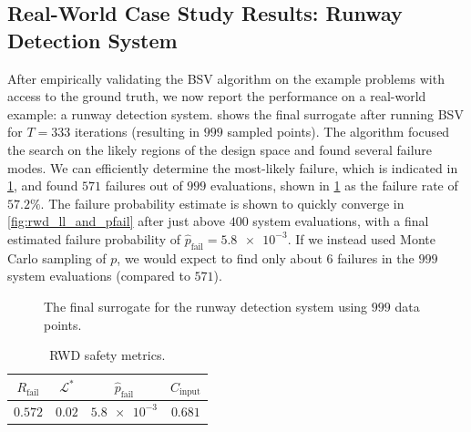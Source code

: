 \subsection{Real-World Case Study Results: Runway Detection System}

After empirically validating the BSV algorithm on the example problems with access to the ground truth, we now report the performance on a real-world example: a runway detection system.
 shows the final surrogate after running BSV for $T=333$ iterations (resulting in $999$ sampled points).
The algorithm focused the search on the likely regions of the design space and found several failure modes.
We can efficiently determine the most-likely failure, which is indicated in \cref{fig:rwd_surrogate}, and found $571$ failures out of $999$ evaluations, shown in \cref{tab:results_rwd} as the failure rate of $57.2 \%$.
The failure probability estimate is shown to quickly converge in \cref{fig:rwd_ll_and_pfail} after just above $400$ system evaluations, with a final estimated failure probability of $\hat{p}_\text{fail} = \num{5.8e-3}$.
If we instead used Monte Carlo sampling of $p$, we would expect to find only about $6$ failures in the $999$ system evaluations (compared to $571$).


\begin{figure}[t!]
    \centering
    
    \caption{The final surrogate for the runway detection system using $\num{999}$ data points.}
    \label{fig:rwd_surrogate}
\end{figure}


\begin{table}
    \vspace*{-3mm}
    \begin{center}
    \begin{threeparttable}
        \begin{small}
        \begin{tabular}{@{}cccc@{}}
        \toprule
            $R_\text{fail}$ & $\mathcal{L}^*$ & $\hat{p}_\text{fail}$ & $C_\text{input}$ \\
            \midrule
            $0.572$ & $0.02$ & $\num{5.8e-3}$ & $0.681$\\
            \bottomrule
        \end{tabular}
        \end{small}
    \end{threeparttable}
    \end{center}
    \vspace*{-3mm}
    \caption{RWD safety metrics.}
    \label{tab:results_rwd}
\end{table}


